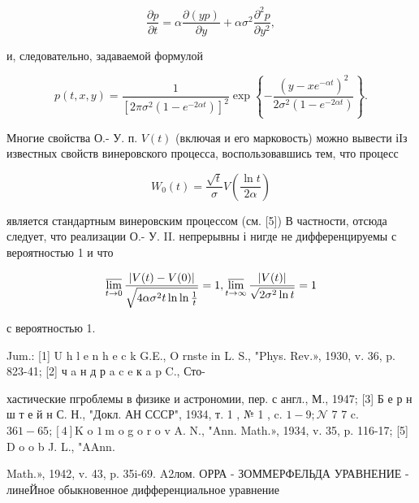 \documentclass[10pt]{article}
\begin{document}
\[

\frac{\partial p}{\partial t}=\alpha \frac{\partial(y p)}{\partial y}+\alpha \sigma^{2} \frac{\partial^{2} p}{\partial y^{2}},

\]



и, следовательно, задаваемой формулой



\[

p(t, x, y)=\frac{1}{\left[2 \pi \sigma^{2}\left(1-e^{-2 \alpha t}\right)\right]^{2}} \exp \left\{-\frac{\left(y-x e^{-\alpha t}\right)^{2}}{2 \sigma^{2}\left(1-e^{-2 \alpha t}\right)}\right\} .

\]



Многие свойства О.- У. п. $V(t)$ (включая и его марковость) можно вывести іІз известных свойств винеровского процесса, воспользовавшись тем, что процесс



\[

W_{0}(t)=\frac{\sqrt{t}}{\sigma} V\left(\frac{\ln t}{2 \alpha}\right)

\]



является стандартным винеровским процессом (см. [5]) В частности, отсюда следует, что реализации О.- У. II. непрерывны і нигде не дифференцируемы с вероятностью 1 и что



\[

\varlimsup_{t \rightarrow 0} \frac{|V(t)-V(0)|}{\sqrt{4 \alpha \sigma^{2} t \ln \ln \frac{1}{t}}}=1, \varlimsup_{t \rightarrow \infty} \frac{|V(t)|}{\sqrt{2 \sigma^{2} \ln t}}=1

\]



с вероятностью 1.



Jum.: [1] U h l e n h e c k G.E., O rnste in L. S., "Phys. Rev.», 1930, v. 36, p. 823-41; [2] ч a н д р a c e к a p C., Сто-

хастические пгроблемы в физике и астрономии, пер. с англ., М., 1947; [3] Б е р н ш т е й н С. Н., "Докл. АН СССР", 1934, т. 1 , № 1 , c. $1-9 ; \mathcal{N}$ 7 7 c. $361-65 ;[4] \mathrm{K}$ o $1 \mathrm{~m}$ o g o r o v A. N., "Ann. Math.», 1934, v. 35, p. 116-17; [5] D o o b J. L., "AAnn.

Math.», 1942, v. 43, p. 35i-69. A2лом. ОРРА - ЗОММЕРФЕЛЬДА УРАВНЕНИЕ - линеЙное обыкновенное дифференциальное уравнение
\end{document}
